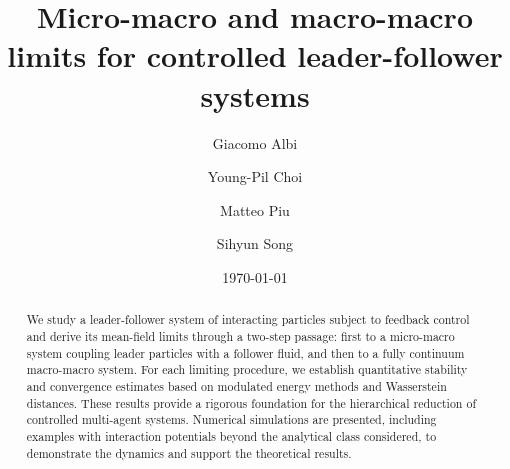 \documentclass[10pt, reqno]{amsart}
\theoremstyle{definition}
\theoremstyle{remark}
\numberwithin{equation}{section}
\begin{document}
\title[Micro-macro and macro-macro limits for controlled leader-follower systems]{Micro-macro and macro-macro limits for controlled leader-follower systems}

\author[Albi]{Giacomo Albi}
\address[Giacomo Albi]{\newline Department of Computer Science\newline
Verona University, Verona 37134, Italy}

\author[Choi]{Young-Pil Choi}
\address[Young-Pil Choi]{\newline Department of Mathematics\newline
Yonsei University, Seoul 03722, Republic of Korea}

\author[Piu]{Matteo Piu}
\address[Matteo Piu]{\newline Department of Computer Science\newline
Verona University, Verona 37134, Italy}

\author[Song]{Sihyun Song}
\address[Sihyun Song]{\newline Department of Mathematics\newline
Yonsei University, Seoul 03722, Republic of Korea}

\date{\today}




\begin{abstract} 
We study a leader-follower system of interacting particles subject to feedback control and derive its mean-field limits through a two-step passage: first to a micro-macro system coupling leader particles with a follower fluid, and then to a fully continuum macro-macro system. For each limiting procedure, we establish quantitative stability and convergence estimates based on modulated energy methods and Wasserstein distances. These results provide a rigorous foundation for the hierarchical reduction of controlled multi-agent systems. Numerical simulations are presented, including examples with interaction potentials beyond the analytical class considered, to demonstrate the dynamics and support the theoretical results.
\end{abstract}

\maketitle
\tableofcontents
\end{document}
